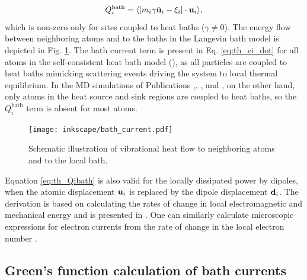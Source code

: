 \begin{equation}
 Q_i^{\textrm{bath}} = \langle [m_i\gamma \dot{\mathbf{u}}_i-\xi_i] \cdot \mathbf{u}_i \rangle, \label{eq:th_Qibath}
\end{equation}
which is non-zero only for sites coupled to heat baths ($\gamma\neq 0$). The energy flow between neighboring atoms and to the baths in the Langevin bath model is depicted in Fig. \ref{fig:vib_currents}. The bath current term is present in Eq. \eqref{eq:th_ei_dot} for all atoms in the self-consistent heat bath model (), as all particles are coupled to heat baths mimicking scattering events driving the system to local thermal equilibrium. In the MD simulations of Publications ,, , and , on the other hand, only atoms in the heat source and sink regions are coupled to heat baths, so the $Q_i^{\textrm{bath}}$ term is absent for most atoms. 

\begin{figure}
 \begin{center}
 \texttt{[image: inkscape/bath\_current.pdf]}
 \end{center}
 \caption{Schematic illustration of vibrational heat flow to neighboring atoms and to the local bath.}
 \label{fig:vib_currents}
\end{figure}

Equation \eqref{eq:th_Qibath} is also valid for the locally dissipated power by dipoles, when the atomic displacement $\mathbf{u}_i$ is replaced by the dipole displacement $\mathbf{d}_i$. The derivation is based on calculating the rates of change in local electromagnetic and mechanical energy and is presented in . One can similarly calculate microscopic expressions for electron currents from the rate of change in the local electron number \cite{roy07}. 

\subsection{Green's function calculation of bath currents}
\label{sec:th_bathcurrents}

